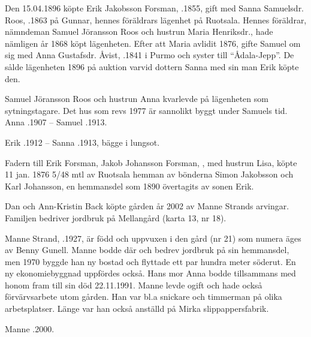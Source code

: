 Den 15.04.1896 köpte Erik Jakobsson Forsman, .1855, gift med Sanna Samuelsdr. Roos, .1863 på Gunnar, hennes föräldrars lägenhet på Ruotsala. Hennes föräldrar, nämndeman  Samuel Jöransson Roos och hustrun Maria Henriksdr., hade nämligen år 1868 köpt lägenheten. Efter att Maria avlidit 1876, gifte Samuel om sig med Anna Gustafsdr. Åvist, .1841 i Purmo och syster till ``Ådala-Jepp''. De sålde lägenheten 1896 på auktion varvid  dottern Sanna med sin man Erik köpte den.
\begin{jhchildren}
  \item {}
  \item {}
  \item {}
  \item {}
  \item {}
  \item {}
\end{jhchildren}
Samuel Jöransson Roos och hustrun Anna kvarlevde på lägenheten som sytningstagare. Det hus som revs 1977 är sannolikt byggt under Samuels tid. Anna .1907  --  Samuel .1913.

Erik .1912  --  Sanna .1913, bägge i lungsot.


Fadern till Erik Forsman, Jakob Johansson Forsman, , med hustrun Lisa,  köpte 11 jan. 1876  5/48 mtl av Ruotsala hemman av bönderna Simon Jakobsson och Karl Johansson, en hemmansdel som 1890 övertagits av sonen Erik.




Dan och Ann-Kristin Back köpte gården år 2002 av Manne Strands arvingar. Familjen bedriver jordbruk på Mellangård     (karta 13, nr 18).

Manne Strand, .1927, är född och uppvuxen i den gård (nr 21) som numera äges av Benny Gunell. Manne bodde där och bedrev jordbruk på sin hemmansdel, men 1970 byggde han ny bostad och flyttade ett  par hundra meter söderut. En ny ekonomiebyggnad uppfördes också. Hans mor Anna bodde tillsammans med honom fram till sin död 22.11.1991. Manne levde ogift och hade också förvärvsarbete utom gården. Han var bl.a snickare och timmerman på olika arbetsplatser. Länge var han också anställd på Mirka slippappersfabrik.

Manne .2000.
